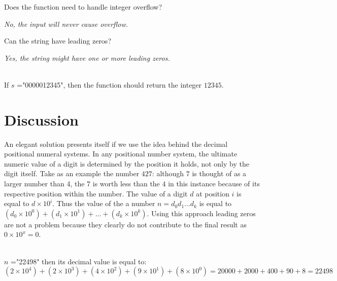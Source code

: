 \begin{QandA}
	\item \begin{questionitem} \begin{question} Does the function need to handle integer overflow?  \end{question} 	 
    \begin{answered}
		\textit{No, the input will never cause overflow.}
	\end{answered} \end{questionitem}

	\item \begin{questionitem} \begin{question} Can the string have leading zeros?  \end{question} 	 
    \begin{answered}
		\textit{Yes, the string might have one or more leading zeros.}
		\begin{example}
			\hfill \\
			If $s$ ="0000012345", then the function should return the integer $12345$.	
		\end{example}
	\end{answered} \end{questionitem}
	
\end{QandA}

\section{Discussion}
\label{string_to_int:sec:discussion}
An elegant solution presents itself if we use the idea behind the decimal positional numeral systems.
In any positional number system, the ultimate numeric value of a digit is determined by the position it holds, not only by the digit itself. Take as an example the number $427$:  although $7$ is thought of as a larger number than 4, the $7$ is worth less than the $4$ in this instance because of its respective position within the number. The value of a digit $d$ at position $i$ is equal to $d\times 10^i$. Thus the value of the a number $n=d_0d_1 \ldots d_k$ is equal to $(d_0 \times 10^0) + (d_1 \times 10^1) + \ldots + (d_k \times 10^k)$.
Using this approach leading zeros are not a problem because they clearly do not contribute to the final result as $0 \times 10^x = 0$.
\begin{example}
	\hfill \\
	 $n$ ="22498" then its decimal value is equal to: $(2 \times 10^4) + (2 \times 10^3) + (4 \times 10^2) + (9 \times 10^1) + (8 \times 10^0) = 20000 + 2000 + 400 +90 +8 = 22498$
\end{example}

